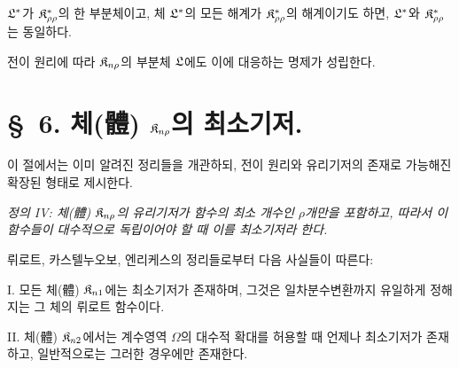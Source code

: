 \glqq{}$\mathfrak L^*$가 $\mathfrak K^*_{\rho\rho}$의 한 부분체이고, 체 $\mathfrak L^*$의 모든 해계가 $\mathfrak K^*_{\rho\rho}$의 해계이기도 하면, $\mathfrak L^*$와 $\mathfrak K^*_{\rho\rho}$는 동일하다.\grqq{}

전이 원리에 따라 $\mathfrak K_{n\rho}$의 부분체 $\mathfrak L$에도 이에 대응하는 명제가 성립한다.

\section*{\S\ 6. 체(體) $\mathfrak K_{n\rho}$의 최소기저.}

이 절에서는 이미 알려진 정리들을 개관하되, 전이 원리와 유리기저의 존재로 가능해진 확장된 형태로 제시한다.

\emph{정의 IV: 체(體) $\mathfrak K_{n\rho}$의 유리기저가 함수의 최소 개수인 $\rho$개만을 포함하고, 따라서 이 함수들이 대수적으로 독립이어야 할 때 이를 최소기저라 한다.}

뤼로트, 카스텔누오보, 엔리케스의 정리들로부터 다음 사실들이 따른다:

I. 모든 체(體) $\mathfrak K_{n1}$에는 최소기저가 존재하며, 그것은 일차분수변환까지 유일하게 정해지는 그 체의 뤼로트 함수이다.

II. 체(體) $\mathfrak K_{n2}$에서는 계수영역 $\Omega$의 대수적 확대를 허용할 때 언제나 최소기저가 존재하고, 일반적으로는 그러한 경우에만 존재한다.

